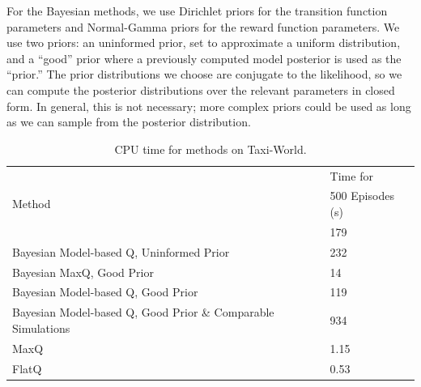 For the Bayesian methods, we use Dirichlet priors for
the transition function parameters and Normal-Gamma priors for the
reward function parameters. We use two priors: an uninformed prior,
set to approximate a uniform distribution, and a ``good'' prior where
a previously computed model posterior is used as the ``prior.''
 The prior
distributions we choose are conjugate to the likelihood, so we can compute the
posterior distributions over the relevant parameters in closed form.
In general, this is not necessary; more complex priors could be used
as long as we can sample from the posterior distribution.
\renewcommand{\arraystretch}{1}
\begin{table}[t] \footnotesize

\caption{CPU time for methods on {\sf Taxi-World}.}

\label{tab:time}

\begin{center}

\begin{tabular}{| p{4cm} | l |}

\hline

\multirow{3}{*}{Method} & Time for \\

&500 Episodes (s)\\ \hline

Bayesian MaxQ, Uninformed Prior &179\\ 

Bayesian Model-based Q, Uninformed Prior &232\\ 

Bayesian MaxQ, Good Prior &14\\ 

Bayesian Model-based Q, Good Prior &119\\ 

Bayesian Model-based Q, Good Prior \& Comparable Simulations
&934 \\ 

MaxQ &1.15 \\

FlatQ &0.53 \\
\hline
\end{tabular}

\end{center}
\vspace{-0.2in}
\end{table}

